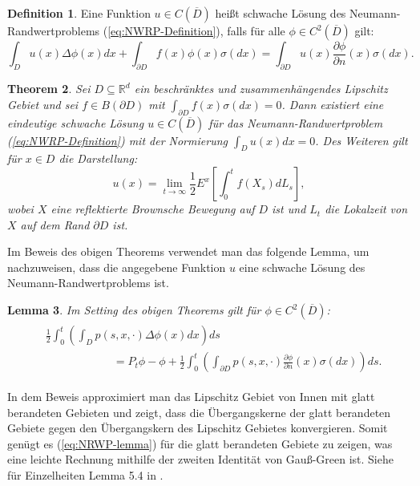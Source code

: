\documentclass[10pt, a4paper, leqno, twoside, bibliography=totocnumbered, final]{scrartcl}
\theoremstyle{definition}
\newtheorem{defin}{Definition}[section]
\theoremstyle{plain}%
\newtheorem{thm}[defin]{Theorem}
\newtheorem{lemma}[defin]{Lemma}
\theoremstyle{remark}
\begin{document}
\begin{defin} 
Eine Funktion $ u \in C(\overline{D}) $ heißt schwache Lösung des Neumann-Randwertproblems (\ref{eq:NWRP-Definition}), falls für alle $ \phi \in C^2( \overline{D}) $ gilt:
\begin{equation}
\label{eq:NRWP-schwache-Lsg}
\int_D u(x) \Delta \phi (x) dx + \int_{\partial D} f(x) \phi(x) \sigma (dx) = \int_{\partial D} u(x) \frac{\partial \phi}{\partial n} (x) \sigma (dx).
\end{equation}
\end{defin}


\begin{thm}
\label{sec:Thm-NRWP}
Sei $D \subseteq \mathbb{R}^d $ ein beschränktes und zusammenhängendes Lipschitz Gebiet und sei $ f \in B( \partial D ) $ mit $ \int_{\partial D} f(x) \sigma (dx) = 0 $. Dann existiert eine eindeutige schwache Lösung $ u \in C(\overline{D}) $ für das Neumann-Randwertproblem (\ref{eq:NWRP-Definition}) mit der Normierung $ \int_D u(x) dx = 0 $. Des Weiteren gilt für $ x \in D $ die Darstellung:
\begin{equation}
\label{eq:thm-NRWP-def}
u(x) = \lim_{t \to \infty} \frac{1}{2} E^x \left[ \int_0^t f(X_s) dL_s \right],
\end{equation}
wobei $X$ eine reflektierte Brownsche Bewegung auf $D$ ist und $L_t$ die Lokalzeit von $X$ auf dem Rand $\partial D $ ist.
\end{thm}

Im Beweis des obigen Theorems verwendet man das folgende Lemma, um nachzuweisen, dass die angegebene Funktion $ u $ eine schwache Lösung des Neumann-Randwertproblems ist.  

\begin{lemma} 
Im Setting des obigen Theorems gilt für $ \phi \in C^2( \overline{D})$:
\begin{align}
\begin{split}
\label{eq:NRWP-lemma}
& \frac{1}{2} \int_0^t \left( \int_D p(s,x, \cdot ) \Delta \phi (x) dx \right) ds \\ 
& \qquad \qquad \qquad = P_t \phi - \phi + \frac{1}{2} \int_0^t \left( \int_{\partial D} p(s,x,\cdot )\frac{\partial \phi}{\partial n} (x) \sigma (dx)  \right) ds .
\end{split}
\end{align}
\end{lemma}

In dem Beweis approximiert man das Lipschitz Gebiet von Innen mit glatt berandeten Gebieten und zeigt, dass die Übergangskerne der glatt berandeten Gebiete gegen den Übergangskern des Lipschitz Gebietes konvergieren. Somit genügt es (\ref{eq:NRWP-lemma}) für die glatt berandeten Gebiete zu zeigen, was eine leichte Rechnung mithilfe der zweiten Identität von Gauß-Green ist. Siehe für Einzelheiten Lemma 5.4 in \cite{Bass-Hsu}.
\end{document}
